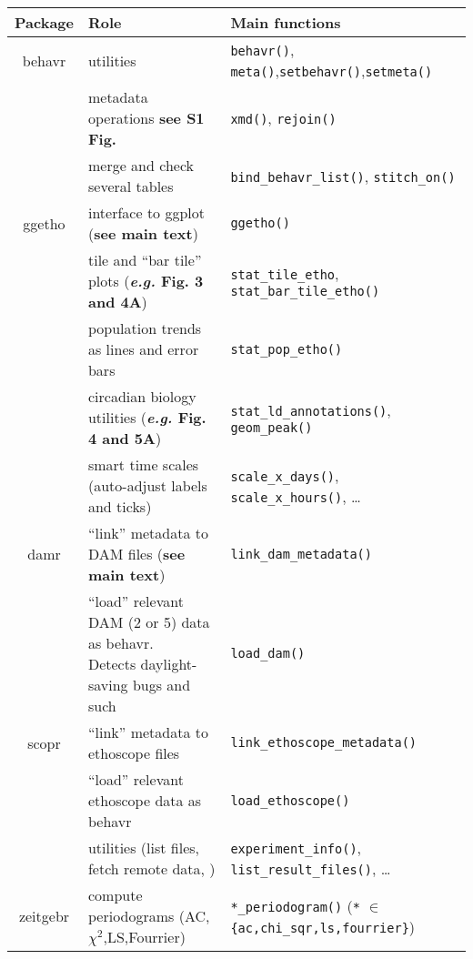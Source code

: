 \documentclass{standalone}
\begin{document}
\begin{tabular}{|l|l|l|}
	\hline
	Package & Role & Main functions \\ \hline \hline
	\multicolumn{ 1}{|c|}{behavr} & utilities & \texttt{behavr()}, \texttt{meta()},\texttt{setbehavr()},\texttt{setmeta()} \\ \cline{ 2- 3}
	\multicolumn{ 1}{|l|}{} & metadata operations \textbf{see S1 Fig.} & \texttt{xmd()}, \texttt{rejoin()} \\ \cline{ 2- 3}
	\multicolumn{ 1}{|l|}{} & merge and check several tables & \texttt{bind\_behavr\_list()}, \texttt{stitch\_on()} \\ \hline
	\multicolumn{ 1}{|c|}{ggetho} & interface to ggplot (\textbf{see main text}) & \texttt{ggetho()} \\ \cline{ 2- 3}
	\multicolumn{ 1}{|c|}{} & tile and ``bar tile'' plots (\textbf{\emph{e.g.} Fig. 3 and 4A}) & \texttt{stat\_tile\_etho}, \texttt{stat\_bar\_tile\_etho()} \\ \cline{ 2- 3}
	\multicolumn{ 1}{|l|}{} & population trends as lines and error bars & \texttt{stat\_pop\_etho()} \\ \cline{ 2- 3}
	\multicolumn{ 1}{|l|}{} & circadian biology utilities (\textbf{\emph{e.g.} Fig. 4 and 5A}) & \texttt{stat\_ld\_annotations()}, \texttt{geom\_peak()} \\ \cline{ 2- 3}
	\multicolumn{ 1}{|l|}{} & smart time scales (auto-adjust labels and ticks) & \texttt{scale\_x\_days()}, \texttt{scale\_x\_hours()}, \dots\\ \hline
	\multicolumn{ 1}{|c|}{damr} & ``link'' metadata to DAM files (\textbf{see main text}) & \texttt{link\_dam\_metadata()} \\ \cline{ 2- 3}
	\multicolumn{ 1}{|l|}{} & \makecell[vl]{``load'' relevant DAM (2 or 5) data as behavr.\\Detects daylight-saving bugs and such} & \texttt{load\_dam()} \\ \hline
	\multicolumn{ 1}{|c|}{scopr} & ``link'' metadata to ethoscope files & \texttt{link\_ethoscope\_metadata()} \\ \cline{ 2- 3}
	\multicolumn{ 1}{|l|}{} & ``load'' relevant ethoscope data as behavr & \texttt{load\_ethoscope()} \\ \cline{ 2- 3}
	\multicolumn{ 1}{|l|}{} & utilities (list files, fetch remote data, ) & \texttt{experiment\_info()}, \texttt{list\_result\_files()}, \dots \\ \hline
	\multicolumn{ 1}{|c|}{zeitgebr} & compute periodograms (AC, $\chi^2$,LS,Fourrier) & \small{\texttt{*\_periodogram()} (\texttt{*} $\in$ \texttt{\{ac,chi\_sqr,ls,fourrier\}})}\\ \cline{ 2- 3}

\end{tabular}
\end{document}
